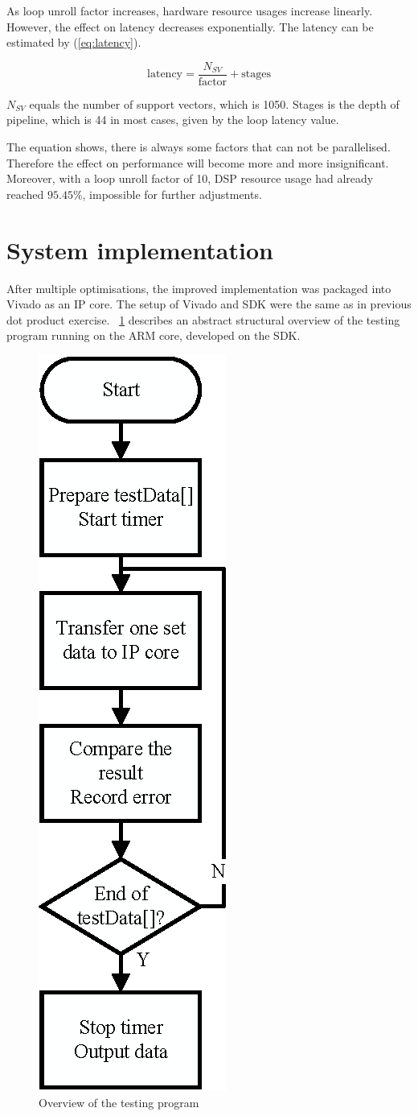 \documentclass[journal]{IEEEtran}
\newcommand{\fref}[1]{\figurename~\ref{#1}}
\newcommand{\eref}[1]{(\ref{#1})}
\newcommand{\improvi}[1]{\improv[inline]{#1}}
\begin{document}
As loop unroll factor increases, hardware resource usages increase linearly. However, the effect on latency decreases exponentially. The latency can be estimated by \eref{eq:latency}.

\begin{equation}
	\text{latency} = \frac{N_{SV}}{\text{factor}} + \text{stages}
	\label{eq:latency}
\end{equation}

$N_{SV}$ equals the number of support vectors, which is 1050. Stages is the depth of pipeline, which is 44 in most cases, given by the loop latency value.

The equation shows, there is always some factors that can not be parallelised. Therefore the effect on performance will become more and more insignificant. Moreover, with a loop unroll factor of 10, DSP resource usage had already reached $95.45 \%$, impossible for further adjustments.

\improvi{More?}

\section{System implementation}

After multiple optimisations, the improved implementation was packaged into Vivado as an IP core. The setup of Vivado and SDK were the same as in previous dot product exercise. \fref{fig:sdk} describes an abstract structural overview of the testing program running on the ARM core, developed on the SDK.

\begin{figure}[t]
	\centering
	\includegraphics[width=0.3\columnwidth]{sdk}
	\caption{Overview of the testing program}
	\label{fig:sdk}
\end{figure}
\end{document}
